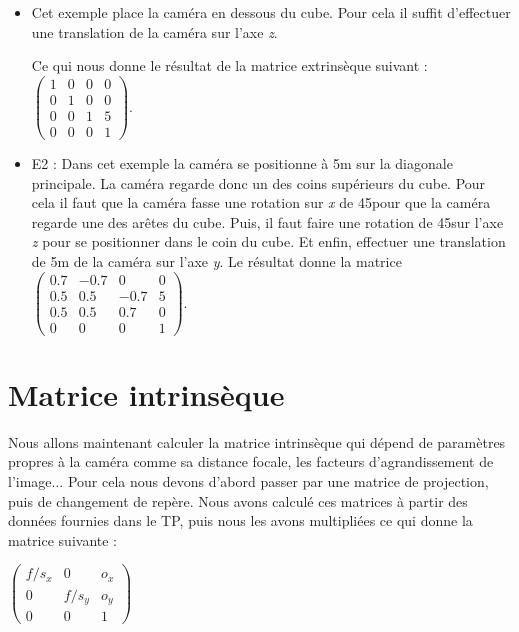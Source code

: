 \documentclass[a4paper,11pt]{article}
\begin{document}
  \begin{itemize}
   \item Cet exemple place la caméra en dessous du cube. Pour cela il suffit
    d'effectuer une translation de la caméra sur l'axe \textit{z}.

    Ce qui nous donne le résultat de la matrice extrinsèque suivant :
    $\begin{pmatrix}
      1 & 0 & 0 & 0\\
      0 & 1 & 0 & 0\\
      0 & 0 & 1 & 5\\
      0 & 0 & 0 & 1
      \end{pmatrix}$.
   \item E2 : Dans cet exemple la caméra se positionne à 5m sur la diagonale principale.
   La caméra regarde donc un des coins supérieurs du cube. Pour cela il faut que la caméra 
   fasse une rotation sur \textit{x} de 45\degre pour que la caméra regarde une des arêtes du cube. Puis,
   il faut faire une rotation de 45\degre sur l'axe \textit{z} pour se positionner dans le coin du cube. 
   Et enfin, effectuer une translation de 5m de la caméra sur l'axe \textit{y}. Le résultat donne la matrice
   $\begin{pmatrix}
      0.7 & -0.7 & 0 & 0\\
      0.5 & 0.5 & -0.7 & 5\\
      0.5 & 0.5 & 0.7 & 0\\
      0 & 0 & 0 & 1
      \end{pmatrix}$.
  \end{itemize}
  
  \section{Matrice intrinsèque}
  
  Nous allons maintenant calculer la matrice intrinsèque qui dépend de paramètres propres à la caméra comme sa 
  distance focale, les facteurs d'agrandissement de l'image... Pour cela nous devons d'abord passer par une matrice 
  de projection, puis de changement de repère. Nous avons calculé ces matrices à partir des données fournies dans le TP,
  puis nous les avons multipliées ce qui donne la matrice suivante :
  
  \begin{center}
   $\begin{pmatrix}
     f/s_x & 0 & o_x\\  
     0 & f/s_y & o_y\\  
     0 & 0 & 1 
     \end{pmatrix}$\\
  \end{center}
     
\end{document}
